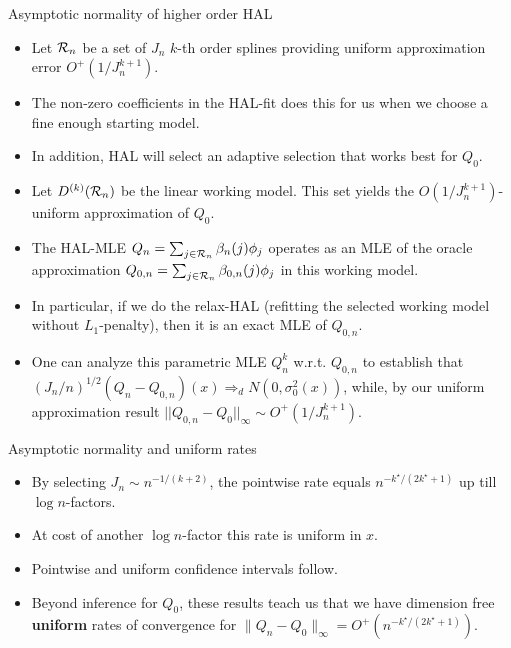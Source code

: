 \documentclass[t]{beamer}
\begin{document}
\begin{frame}{Asymptotic normality of higher order HAL}
\begin{itemize}
\item Let ${\cal R}_n$ be a set of $J_n$ $k$-th order splines  providing uniform approximation error $O^+(1/J_n^{k+1})$.
\item The non-zero coefficients in the HAL-fit  does this for us when we choose a fine enough starting model.
\item In addition, HAL will select an adaptive selection that works best for $Q_0$.
\item Let $D^{(k)}({\cal R}_n)$ be the linear working model. This set yields the $O(1/J_n^{k+1})$-uniform approximation of $Q_0$.
 \item The HAL-MLE $Q_n=\sum_{j\in {\cal R}_n}\beta_n(j)\phi_j$ operates as an MLE of the oracle approximation $Q_{0,n}=\sum_{j\in {\cal R}_n}\beta_{0,n}(j)\phi_j$ in this working model.
 \end{itemize}
\end{frame}

\begin{frame}
 \begin{itemize}
 \item In particular, if we do the relax-HAL (refitting the selected working model without $L_1$-penalty), then it is an exact MLE of $Q_{0,n}$.
 \item One can analyze this parametric MLE $Q_n^k$ w.r.t. $Q_{0,n}$ to establish that  $(J_n/n)^{1/2}(Q_n-Q_{0,n})(x)\Rightarrow_d N(0,\sigma^2_0(x))$, while, by our uniform approximation result $|| Q_{0,n}-Q_0 ||_{\infty}\sim O^+(1/J_n^{k+1})$.
 \end{itemize}
\end{frame}

\begin{frame}{Asymptotic normality and uniform rates}
\begin{itemize}
\item By selecting $J_n\sim n^{-1/(k+2)}$, the pointwise rate equals
$n^{-k^{\star}/(2k^{\star}+1)}$ up till $\log n$-factors.
\item At cost of another $\log n$-factor this rate is uniform in $x$.
\item Pointwise and uniform confidence intervals follow.
\item Beyond inference for $Q_0$, these results teach us that we have dimension
free {\bf uniform} rates of convergence for $\lVert
Q_n-Q_0\rVert_{\infty}=O^+(n^{-k^{\star}/(2k^{\star}+1)})$.
\end{itemize}
\end{frame}
\end{document}
